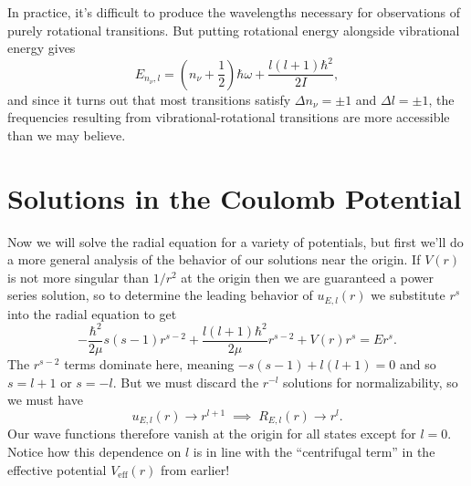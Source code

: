 \documentclass[../p116main.tex]{subfiles}
\begin{document}
In practice, it's difficult to produce the wavelengths necessary for observations of purely rotational transitions.
But putting rotational energy alongside vibrational energy gives
\[ E_{n_\nu, l} = \left( n_\nu + \frac{1}{2} \right) \hbar \omega + \frac{l(l+1) \hbar^2}{2I}, \]
and since it turns out that most transitions satisfy $\Delta n_\nu = \pm 1$ and $\Delta l = \pm 1$, the frequencies resulting from vibrational-rotational transitions are more accessible than we may believe.

\section{Solutions in the Coulomb Potential}
Now we will solve the radial equation for a variety of potentials, but first we'll do a more general analysis of the behavior of our solutions near the origin.
If $V(r)$ is not more singular than $1 / r^2$ at the origin then we are guaranteed a power series solution, so to determine the leading behavior of $u_{E,l}(r)$ we substitute $r^s$ into the radial equation to get
\[ -\frac{\hbar^2}{2\mu} s(s - 1) r^{s-2} + \frac{l(l+1) \hbar^2}{2\mu} r^{s-2} + V(r) r^s = E r^s. \]
The $r^{s-2}$ terms dominate here, meaning $-s(s-1) + l(l+1) = 0$ and so $s = l+1$ or $s = -l$.
But we must discard the $r^{-l}$ solutions for normalizability, so we must have
\[ u_{E,l}(r) \longrightarrow r^{l+1} \;\implies\; R_{E,l}(r) \longrightarrow r^{l}. \]
Our wave functions therefore vanish at the origin for all states except for $l=0$.
Notice how this dependence on $l$ is in line with the ``centrifugal term'' in the effective potential $V_\textrm{eff}(r)$ from earlier!
\end{document}

